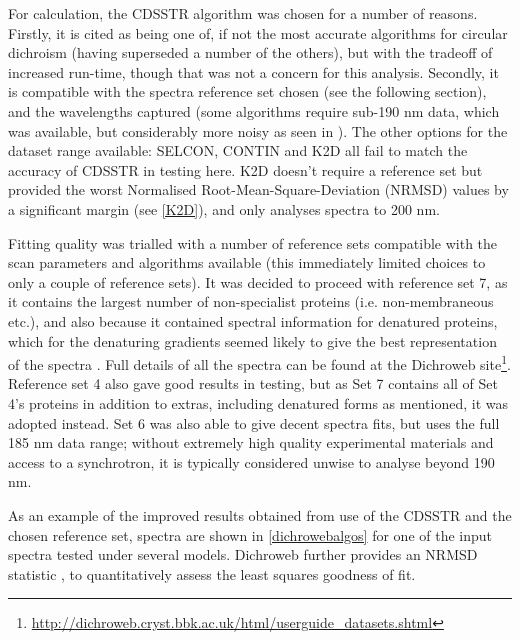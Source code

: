 For calculation, the CDSSTR algorithm \citep{Compton1986,Sreerama2000b, Manavalan1987} was chosen for a number of reasons. Firstly, it is cited as being one of, if not the most accurate algorithms for circular dichroism (having superseded a number of the others), but with the tradeoff of increased run-time, though that was not a concern for this analysis. Secondly, it is compatible with the spectra reference set chosen (see the following section), and the wavelengths captured (some algorithms require sub-190 nm data, which was available, but considerably more noisy as seen in ). The other options for the dataset range available: SELCON, CONTIN and K2D all fail to match the accuracy of CDSSTR in testing here. K2D doesn't require a reference set but provided the worst Normalised Root-Mean-Square-Deviation (NRMSD) values by a significant margin (see \vref{K2D}), and only analyses spectra to 200 nm.

Fitting quality was trialled with a number of reference sets compatible with the scan parameters and algorithms available (this immediately limited choices to only a couple of reference sets). It was decided to proceed with reference set 7, as it contains the largest number of non-specialist proteins (i.e. non-membraneous etc.), and also because it contained spectral information for denatured proteins, which for the denaturing gradients seemed likely to give the best representation of the spectra \citep{Sreerama2000b,Sreerama2000a}. Full details of all the spectra can be found at the Dichroweb site\footnote{\url{http://dichroweb.cryst.bbk.ac.uk/html/userguide_datasets.shtml}}. Reference set 4 also gave good results in testing, but as Set 7 contains all of Set 4's proteins in addition to extras, including denatured forms as mentioned, it was adopted instead. Set 6 was also able to give decent spectra fits, but uses the full 185 nm data range; without extremely high quality experimental materials and access to a synchrotron, it is typically considered unwise to analyse beyond 190 nm.

As an example of the improved results obtained from use of the CDSSTR and the chosen reference set, spectra are shown in \vref{dichrowebalgos} for one of the input spectra tested under several models. Dichroweb further provides an NRMSD statistic \citep{Mao1982}, to quantitatively assess the least squares goodness of fit.

